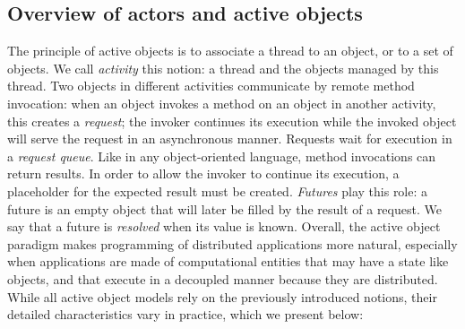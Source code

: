 \subsection{Overview of actors and active objects}\label{overview}
The principle of active objects is to associate a thread to an object, or to a set of
objects. We call \emph{activity} this notion: a thread and the objects
managed by this thread.  Two objects in different activities 
communicate by remote method invocation: when an object invokes a
method on an object in another activity, this creates a
\emph{request}; the invoker continues its execution while the invoked
object will serve the request in an asynchronous manner. Requests wait for execution in a \emph{request queue}. Like in any
object-oriented language, method invocations can return results. In
order to allow the invoker to continue its execution, a placeholder
for the expected result must be created. \emph{Futures} play this
role: a future is an empty object that will later be filled by the
result of a request. We say that a future is \emph{resolved} when its
value is known.
 Overall, the active object paradigm makes programming of distributed
 applications more natural, especially when applications are made of
computational entities that may have a state like objects, and that
execute in a decoupled manner because they are distributed.
While all active object models rely on the previously introduced notions, their
detailed characteristics vary in practice, which we present below:

